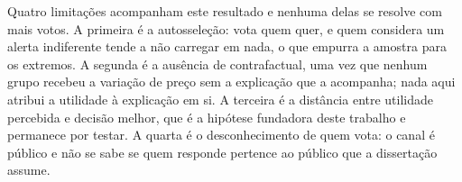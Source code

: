 Quatro limitações acompanham este resultado e nenhuma delas se resolve com mais votos. A primeira é a autosseleção: vota quem quer, e quem considera um alerta indiferente tende a não carregar em nada, o que empurra a amostra para os extremos. A segunda é a ausência de contrafactual, uma vez que nenhum grupo recebeu a variação de preço sem a explicação que a acompanha; nada aqui atribui a utilidade à explicação em si. A terceira é a distância entre utilidade percebida e decisão melhor, que é a hipótese fundadora deste trabalho e permanece por testar. A quarta é o desconhecimento de quem vota: o canal é público e não se sabe se quem responde pertence ao público que a dissertação assume.
